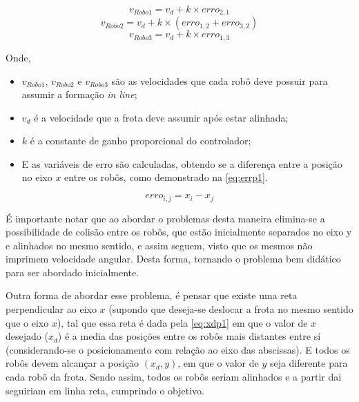 \begin{equation}
v_{Robo1} = v_{d} + k \times erro_{2,1}
\label{eq:vel1P1}
\end{equation}
\begin{equation}
v_{Robo2} = v_{d} + k\times (erro_{1,2} + erro_{3,2})
\label{eq:vel2P1}
\end{equation}
\begin{equation}
v_{Robo3} = v_{d} + k\times erro_{1,3}
\label{eq:vel3P1}
\end{equation}

Onde,
\begin{itemize}
	\item $v_{Robo1}$, $v_{Robo2}$ e $v_{Robo3}$ são as velocidades que cada robô deve possuir para assumir a formação \emph{in line};
	\item $v_{d}$ é a velocidade que a frota deve assumir após estar alinhada;
	\item $k$ é a constante de ganho proporcional do controlador;
	\item E as variáveis de erro são calculadas, obtendo se a diferença entre a posição no eixo $x$ entre os robôs, como demonstrado na \autoref{eq:errp1}.	
\end{itemize}

\begin{equation}
erro_{i,j} = x_{i} - x_{j}
\label{eq:errp1}
\end{equation}

É importante notar que ao abordar o problemas desta maneira elimina-se a possibilidade de colisão entre os robôs, que estão inicialmente separados no eixo y e alinhados no mesmo sentido, e assim seguem, visto que os mesmos não imprimem velocidade angular. Desta forma, tornando o problema bem didático para ser abordado inicialmente. %

Outra forma de abordar esse problema, é pensar que existe uma reta perpendicular ao eixo $x$ (supondo que deseja-se deslocar a frota no mesmo sentido que o eixo $x$), tal que essa reta é dada pela \autoref{eq:xdp1} em que o valor de $x$ desejado ($x_{d}$) é a media das posições entre os robôs mais distantes entre sí (considerando-se o posicionamento com relação ao eixo das abscissas). E todos os robôs devem alcançar a posição $(x_{d},y)$, em que o valor de $y$ seja diferente para cada robô da frota. Sendo assim, todos os robôs seriam alinhados e a partir dai seguiriam em linha reta, cumprindo o objetivo.

